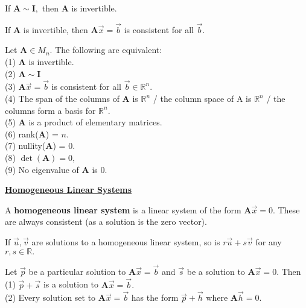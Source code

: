 \documentclass{article}
\begin{document}
    \begin{corollary}
    If $\boldsymbol{A} \sim \boldsymbol{I},$ then $\boldsymbol{A}$ is invertible.
    \end{corollary}

    \begin{theorem}
    If $\boldsymbol{A}$ is invertible, then $\boldsymbol{A}\vec{x} = \vec{b}$ is consistent for all $\vec{b}.$ \\ 
    \end{theorem}
    
    
    \begin{theorem}[TFAE]
    Let $\boldsymbol{A} \in M_n.$ The following are equivalent: \\
    (1) $\boldsymbol{A}$ is invertible. \\
    (2) $\boldsymbol{A} \sim \boldsymbol{I}$ \\
    (3) $\boldsymbol{A}\vec{x} = \vec{b}$ is consistent for all $\vec{b} \in \mathbb{R}^n$. \\
    (4) The span of the columns of $\boldsymbol{A}$ is $\mathbb{R}^n$ / the column space of A is $\mathbb{R}^n$ / the columns form a basis for $\mathbb{R}^n.$ \\
    (5) $\boldsymbol{A}$ is a product of elementary matrices. \\
    (6) rank($\boldsymbol{A}$) = $n$. \\
    (7) nullity($\boldsymbol{A}$) = 0.\\
    (8) $\det(\boldsymbol{A}) = 0,$ \\
    (9) No eigenvalue of $\boldsymbol{A}$ is $0$.
    \end{theorem}

\newpage

\textbf{\underline{Homogeneous Linear Systems}}
\begin{definition}
A \textbf{homogeneous linear system} is a linear system of the form $\boldsymbol{A}\vec{x} = 0.$ These are always consistent (as a solution is the zero vector).
\end{definition}

\begin{theorem}
If $\vec{u}, \vec{v}$ are solutions to a homogeneous linear system, so is $r\vec{u} + s\vec{v}$ for any $r, s \in \mathbb{R}.$
\end{theorem}    

\begin{theorem}
Let $\vec{p}$ be a particular solution to $\boldsymbol{A}\vec{x} = \vec{b}$ and $\vec{s}$ be a solution to $\boldsymbol{A}\vec{x} = 0.$ Then \\
(1) $\vec{p} + \vec{s}$ is a solution to $\boldsymbol{A}\vec{x} = \vec{b}.$ \\
(2) Every solution set to $\boldsymbol{A}\vec{x} = \vec{b}$ has the form $\vec{p} + \vec{h}$ where $\boldsymbol{A}\vec{h} = 0.$ \\ \\
\end{theorem}
\end{document}
